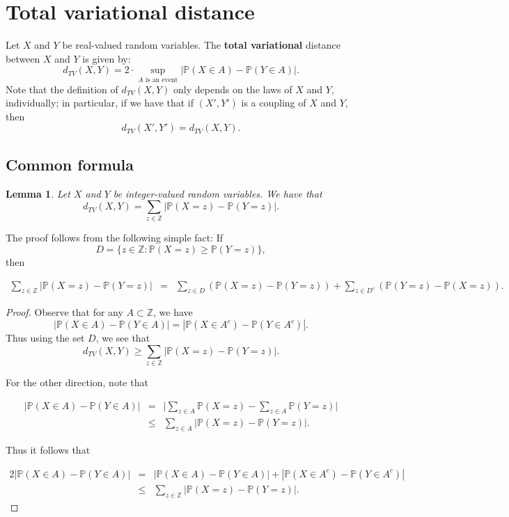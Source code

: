 \documentclass[
]{article}
\newtheorem{lemma}{Lemma}[section]
\theoremstyle{definition}
\theoremstyle{definition}
\theoremstyle{definition}
\theoremstyle{definition}
\theoremstyle{remark}
\begin{document}
\hypertarget{total-variational-distance}{%
\section{Total variational distance}\label{total-variational-distance}}

Let \(X\) and \(Y\) be real-valued random variables. The \textbf{total variational} distance between \(X\) and \(Y\) is given by:\\
\[d_{TV}(X,Y) = 2 \cdot \sup_{A  \text{ is an event}} | \mathbb{P}(X \in A) - \mathbb{P}(Y \in A)|.\] Note that the definition of \(d_{TV}(X,Y)\) only depends on the laws of \(X\) and \(Y\), individually; in particular, if we have that if \((X',Y')\) is a coupling of \(X\) and \(Y\), then \[d_{TV}(X',Y') = d_{TV}(X,Y).\]

\hypertarget{common-formula}{%
\subsection{Common formula}\label{common-formula}}

\begin{lemma}
\protect\hypertarget{lem:unnamed-chunk-5}{}\label{lem:unnamed-chunk-5}Let \(X\) and \(Y\) be integer-valued random variables. We have that
\[d_{TV}(X,Y) = \sum_{z \in \mathbb{Z}} | \mathbb{P}(X=z) - \mathbb{P}(Y=z)|.\]
\end{lemma}

The proof follows from the following simple fact:
If \[D = \{z \in \mathbb{Z}:  \mathbb{P}(X =z) \geq \mathbb{P}(Y=z)\},\] then

\begin{eqnarray*} \sum_{z \in \mathbb{Z}} | \mathbb{P}(X=z) - \mathbb{P}(Y=z)| 
&=& \sum_{z \in D} (\mathbb{P}(X=z) - \mathbb{P}(Y=z))+\sum_{z \in D^c} (\mathbb{P}(Y=z) - \mathbb{P}(X=z)).
\end{eqnarray*}

\begin{proof}
Observe that for any \(A \subset \mathbb{Z}\), we have
\[|\mathbb{P}(X \in A) - \mathbb{P}(Y \in A)| = |\mathbb{P}(X \in A^c) - \mathbb{P}(Y\in A^c)|.\]
Thus using the set \(D\), we see that
\[d_{TV}(X,Y) \geq \sum_{z \in \mathbb{Z}} | \mathbb{P}(X=z) - \mathbb{P}(Y=z)|.\]

For the other direction, note that

\begin{eqnarray*}
        |\mathbb{P}(X \in A) - \mathbb{P}(Y \in A)| &=& \big|\sum_{z \in A} \mathbb{P}(X =z) - \sum_{z \in A} \mathbb{P}(Y=z) \big| \\
        &\leq& \sum_{z \in A} |\mathbb{P}(X=z) - \mathbb{P}(Y=z)|.
\end{eqnarray*}

Thus it follows that

\begin{eqnarray*}
    2| \mathbb{P}(X \in A) - \mathbb{P}(Y \in A)| 
&=& |\mathbb{P}(X \in A) - \mathbb{P}(Y \in A)| + |\mathbb{P}(X \in A^c)  - \mathbb{P}(Y \in A^c)| \\
        &\leq&   \sum_{z \in \mathbb{Z}} |\mathbb{P}(X=z) - \mathbb{P}(Y=z)|.
    \end{eqnarray*}
\end{proof}
\end{document}
